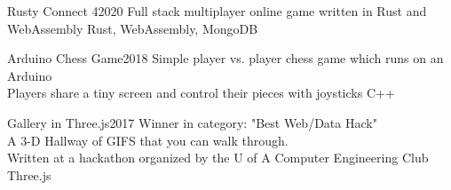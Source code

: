 
\begin{projects}
    \project
    {Rusty Connect 4}{2020}
    {}
    {Full stack multiplayer online game written in Rust and WebAssembly}
    {Rust, WebAssembly, MongoDB}

    \project
    {Arduino Chess Game}{2018}
    {}
    {Simple player vs. player chess game which runs on an Arduino\\
      Players share a tiny screen and control their pieces with joysticks}
    {C++}

	\project
	{Gallery in Three.js}{2017}
	{}
	{
            Winner in category: "Best Web/Data Hack"\\
            A 3-D Hallway of GIFS that you can walk through.\\
            Written at a hackathon organized by the U of A Computer Engineering Club 
    }
    {Three.js}
				

\end{projects}
